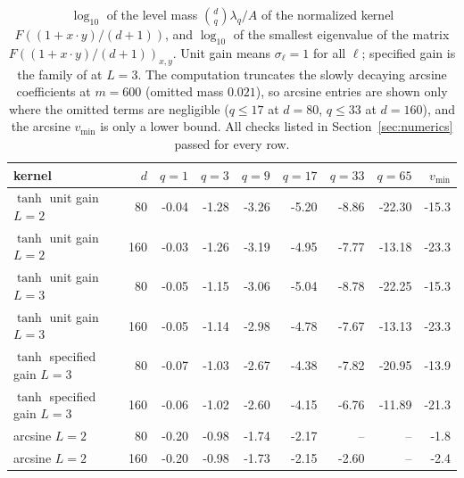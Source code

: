 \begin{table}[ht]
\centering\small
\begin{tabular}{@{}lrrrrrrrr@{}}
\toprule
kernel & $d$ & $q=1$ & $q=3$ & $q=9$ & $q=17$ & $q=33$ & $q=65$ & $v_{\min}$\\
\midrule
$\tanh$ unit gain $L=2$ & 80 & -0.04 & -1.28 & -3.26 & -5.20 & -8.86 & -22.30 & -15.3 \\
$\tanh$ unit gain $L=2$ & 160 & -0.03 & -1.26 & -3.19 & -4.95 & -7.77 & -13.18 & -23.3 \\
$\tanh$ unit gain $L=3$ & 80 & -0.05 & -1.15 & -3.06 & -5.04 & -8.78 & -22.25 & -15.3 \\
$\tanh$ unit gain $L=3$ & 160 & -0.05 & -1.14 & -2.98 & -4.78 & -7.67 & -13.13 & -23.3 \\
$\tanh$ specified gain $L=3$ & 80 & -0.07 & -1.03 & -2.67 & -4.38 & -7.82 & -20.95 & -13.9 \\
$\tanh$ specified gain $L=3$ & 160 & -0.06 & -1.02 & -2.60 & -4.15 & -6.76 & -11.89 & -21.3 \\
arcsine $L=2$ & 80 & -0.20 & -0.98 & -1.74 & -2.17 & -- & -- & -1.8 \\
arcsine $L=2$ & 160 & -0.20 & -0.98 & -1.73 & -2.15 & -2.60 & -- & -2.4 \\
\bottomrule
\end{tabular}
\caption{$\log_{10}$ of the level mass $\binom dq\lambda_q/A$ of the normalized kernel $F((1+x\cdot y)/(d+1))$,
and $\log_{10}$ of the smallest eigenvalue of the matrix $F((1+x\cdot y)/(d+1))_{x,y}$. Unit gain means
$\sigma_\ell=1$ for all $\ell$; specified gain is the family of \cite[Section~7]{nngpnote} at $L=3$.
The computation truncates the slowly decaying arcsine
coefficients at $m=600$ (omitted mass $0.021$), so arcsine entries are shown only where the omitted terms
are negligible ($q\le17$ at $d=80$, $q\le33$ at $d=160$), and the arcsine $v_{\min}$ is only a lower bound. All checks listed in Section~\ref{sec:numerics} passed for every row.}
\label{tab:spectrum}
\end{table}
